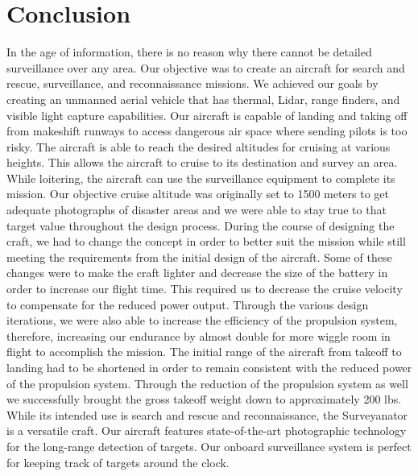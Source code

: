 \documentclass[12pt,A4paper]{article}
\begin{document}
	\clearpage
	\section{Conclusion}
	\hspace{.15 in}In the age of information, there is no reason why there cannot be detailed surveillance over any area. Our objective was to create an aircraft for search and rescue, surveillance, and reconnaissance missions. We achieved our goals by creating an unmanned aerial vehicle that has thermal, Lidar, range finders, and visible light capture capabilities. Our aircraft is capable of landing and taking off from makeshift runways to access dangerous air space where sending pilots is too risky.  The aircraft is able to reach the desired altitudes for cruising at various heights. This allows the aircraft to cruise to its destination and survey an area. While loitering, the aircraft can use the surveillance equipment to complete its mission. Our objective cruise altitude was originally set to 1500 meters to get adequate photographs of disaster areas and we were able to stay true to that target value throughout the design process. During the course of designing the craft, we had to change the concept in order to better suit the mission while still meeting the requirements from the initial design of the aircraft. Some of these changes were to make the craft lighter and decrease the size of the battery in order to increase our flight time. This required us to decrease the cruise velocity to compensate for the reduced power output. Through the various design iterations, we were also able to increase the efficiency of the propulsion system, therefore, increasing our endurance by almost double for more wiggle room in flight to accomplish the mission. The initial range of the aircraft from takeoff to landing had to be shortened in order to remain consistent with the reduced power of the propulsion system. Through the reduction of the propulsion system as well we successfully brought the gross takeoff weight down to approximately 200 lbs. While its intended use is search and rescue and reconnaissance, the Surveyanator is a versatile craft. Our aircraft features state-of-the-art photographic technology for the long-range detection of targets. Our onboard surveillance system is perfect for keeping track of targets around the clock.
	\clearpage
\end{document}
